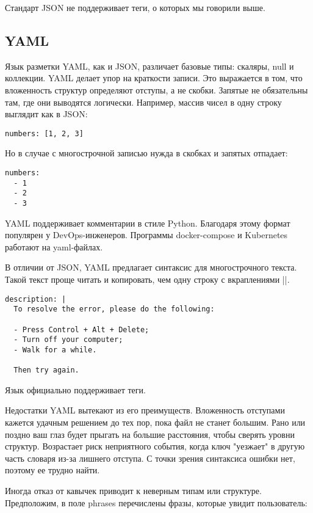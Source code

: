 Стандарт JSON не поддерживает теги, о которых мы говорили выше.

\subsection{YAML}

Язык разметки YAML, как и JSON, различает базовые типы: скаляры, null и
коллекции. YAML делает упор на краткости записи. Это выражается в том, что
вложенность структур определяют отступы, а не скобки. Запятые не обязательны
там, где они выводятся логически. Например, массив чисел в одну строку выглядит
как в JSON:

\begin{verbatim}
numbers: [1, 2, 3]
\end{verbatim}

Но в случае с многострочной записью нужда в скобках и запятых отпадает:

\begin{verbatim}
numbers:
  - 1
  - 2
  - 3
\end{verbatim}

YAML поддерживает комментарии в стиле Python. Благодаря этому формат популярен у
DevOps-инженеров. Программы docker-compose и Kubernetes работают на yaml-файлах.

В отличии от JSON, YAML предлагает синтаксис для многострочного текста. Такой
текст проще читать и копировать, чем одну строку с вкраплениями \spverb|\n|.

\begin{verbatim}
description: |
  To resolve the error, please do the following:

  - Press Control + Alt + Delete;
  - Turn off your computer;
  - Walk for a while.

  Then try again.
\end{verbatim}

Язык официально поддерживает теги.

Недостатки YAML вытекают из его преимуществ. Вложенность отступами кажется
удачным решением до тех пор, пока файл не станет большим. Рано или поздно ваш
глаз будет прыгать на большие расстояния, чтобы сверять уровни
структур. Возрастает риск неприятного события, когда ключ "уезжает" в другую
часть словаря из-за лишнего отступа. С точки зрения синтаксиса ошибки нет,
поэтому ее трудно найти.

Иногда отказ от кавычек приводит к неверным типам или структуре. Предположим, в
поле phrases перечислены фразы, которые увидит пользователь:


